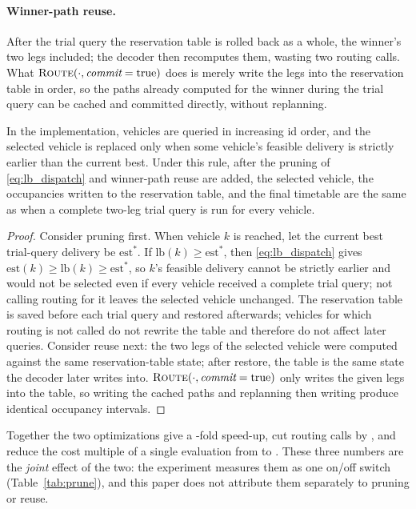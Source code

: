 \paragraph{Winner-path reuse.}
After the trial query the reservation table is rolled back as a whole, the winner's two legs included; the decoder then recomputes them, wasting two routing calls.
What $\textsc{Route}(\cdot,\textit{commit}=\text{true})$ does is merely write the legs into the reservation table in order, so the paths already computed for the winner during the trial query can be cached and committed directly, without replanning.

\begin{prop}
  \label{prop:speedup_equiv}
  In the implementation, vehicles are queried in increasing id order, and the selected vehicle is replaced only when some vehicle's feasible delivery is strictly earlier than the current best.
  Under this rule, after the pruning of \eqref{eq:lb_dispatch} and winner-path reuse are added, the selected vehicle, the occupancies written to the reservation table, and the final timetable are the same as when a complete two-leg trial query is run for every vehicle.
\end{prop}

\begin{proof}
  Consider pruning first.
  When vehicle $k$ is reached, let the current best trial-query delivery be $\mathrm{est}^{\ast}$.
  If $\mathrm{lb}(k)\ge \mathrm{est}^{\ast}$, then \eqref{eq:lb_dispatch} gives
  $\mathrm{est}(k)\ge\mathrm{lb}(k)\ge\mathrm{est}^{\ast}$,
  so $k$'s feasible delivery cannot be strictly earlier and would not be selected even if every vehicle received a complete trial query; not calling routing for it leaves the selected vehicle unchanged.
  The reservation table is saved before each trial query and restored afterwards; vehicles for which routing is not called do not rewrite the table and therefore do not affect later queries.
  Consider reuse next: the two legs of the selected vehicle were computed against the same reservation-table state; after restore, the table is the same state the decoder later writes into.
  $\textsc{Route}(\cdot,\textit{commit}=\text{true})$ only writes the given legs into the table, so writing the cached paths and replanning then writing produce identical occupancy intervals.
\end{proof}

Together the two optimizations give a \SpeedupProbe{}-fold speed-up, cut routing calls by \RouteCallCut{}, and reduce the cost multiple of a single evaluation from \CostMultBefore{} to \CostMultAfter{}.
These three numbers are the \emph{joint} effect of the two: the experiment measures them as one on/off switch (Table~\ref{tab:prune}), and this paper does not attribute them separately to pruning or reuse.

